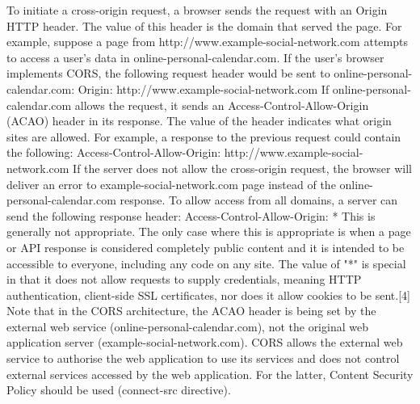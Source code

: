 To initiate a cross-origin request, a browser sends the request with an Origin HTTP header. The value of this header is the domain that served the page. For example, suppose a page from http://www.example-social-network.com attempts to access a user's data in online-personal-calendar.com. If the user's browser implements CORS, the following request header would be sent to online-personal-calendar.com:
 Origin: http://www.example-social-network.com
If online-personal-calendar.com allows the request, it sends an Access-Control-Allow-Origin (ACAO) header in its response. The value of the header indicates what origin sites are allowed. For example, a response to the previous request could contain the following:
 Access-Control-Allow-Origin: http://www.example-social-network.com
If the server does not allow the cross-origin request, the browser will deliver an error to example-social-network.com page instead of the online-personal-calendar.com response.
To allow access from all domains, a server can send the following response header:
 Access-Control-Allow-Origin: *
This is generally not appropriate. The only case where this is appropriate is when a page or API response is considered completely public content and it is intended to be accessible to everyone, including any code on any site.
The value of "*" is special in that it does not allow requests to supply credentials, meaning HTTP authentication, client-side SSL certificates, nor does it allow cookies to be sent.[4]
Note that in the CORS architecture, the ACAO header is being set by the external web service (online-personal-calendar.com), not the original web application server (example-social-network.com). CORS allows the external web service to authorise the web application to use its services and does not control external services accessed by the web application. For the latter, Content Security Policy should be used (connect-src directive).






